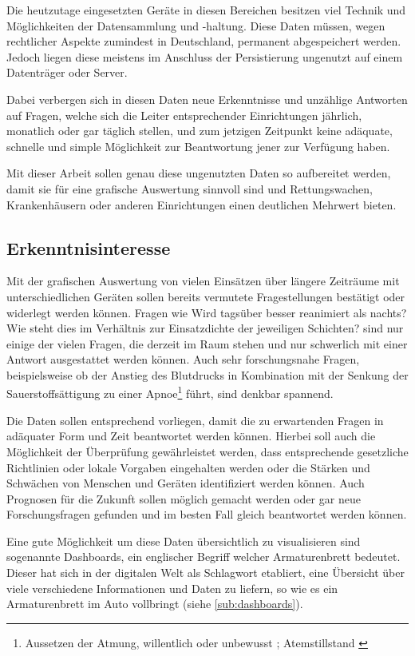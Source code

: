 Die heutzutage eingesetzten Geräte in diesen Bereichen besitzen viel Technik und Möglichkeiten der Datensammlung und -haltung.
Diese Daten müssen, wegen rechtlicher Aspekte zumindest in Deutschland, permanent abgespeichert werden.
Jedoch liegen diese meistens im Anschluss der Persistierung ungenutzt auf einem Datenträger oder Server.

Dabei verbergen sich in diesen Daten neue Erkenntnisse und unzählige Antworten auf Fragen, welche sich die Leiter entsprechender Einrichtungen jährlich, monatlich oder gar täglich stellen, und zum jetzigen Zeitpunkt keine adäquate, schnelle und simple Möglichkeit zur Beantwortung jener zur Verfügung haben.

Mit dieser Arbeit sollen genau diese ungenutzten Daten so aufbereitet werden, damit sie für eine grafische Auswertung sinnvoll sind und Rettungswachen, Krankenhäusern oder anderen Einrichtungen einen deutlichen Mehrwert bieten.

\subsection{Erkenntnisinteresse}
\label{erkenntnis}
Mit der grafischen Auswertung von vielen Einsätzen über längere Zeiträume mit unterschiedlichen Geräten sollen bereits vermutete Fragestellungen bestätigt oder widerlegt werden können.
Fragen wie \glqq Wird tagsüber besser reanimiert als nachts? Wie steht dies im Verhältnis zur Einsatzdichte der jeweiligen Schichten?\grqq{} sind nur einige der vielen Fragen, die derzeit im Raum stehen und nur schwerlich mit einer Antwort ausgestattet werden können.
Auch sehr forschungsnahe Fragen, beispielsweise ob der Anstieg des Blutdrucks in Kombination mit der Senkung der Sauerstoffsättigung zu einer Apnoe\footnote{Aussetzen der Atmung, willentlich oder unbewusst \cite[S.168]{Adams.2016}; Atemstillstand \cite{Dudenredaktion.2015}} führt, sind denkbar spannend.

Die Daten sollen entsprechend vorliegen, damit die zu erwartenden Fragen in adäquater Form und Zeit beantwortet werden können.
Hierbei soll auch die Möglichkeit der Überprüfung gewährleistet werden, dass entsprechende gesetzliche Richtlinien \cite{Maconochie.2015} oder lokale Vorgaben eingehalten werden oder die Stärken und Schwächen von Menschen und Geräten identifiziert werden können.
Auch Prognosen für die Zukunft sollen möglich gemacht werden oder gar neue Forschungsfragen gefunden  und im besten Fall gleich beantwortet werden können.

Eine gute Möglichkeit um diese Daten übersichtlich zu visualisieren sind sogenannte \glqq \gls{Dashboard}s\grqq, ein englischer Begriff welcher \glqq Armaturenbrett\grqq{} bedeutet.
Dieser hat sich in der digitalen Welt als Schlagwort etabliert, eine Übersicht über viele verschiedene Informationen und Daten zu liefern, so wie es ein Armaturenbrett im Auto vollbringt (siehe \ref{sub:dashboards}).

